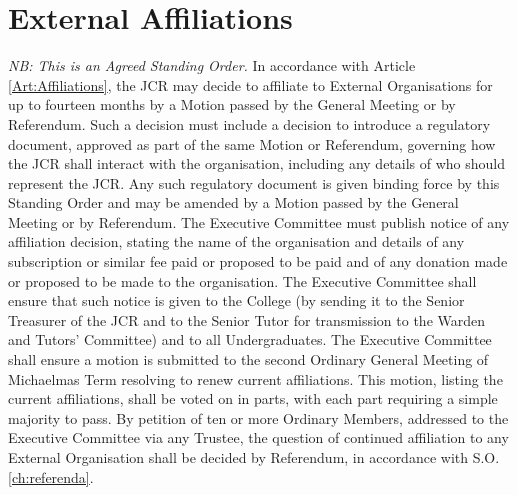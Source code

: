 \chapter{External Affiliations} \label{ch:affiliations}
\textit{NB: This is an Agreed Standing Order.}
\npara In accordance with Article \ref{Art:Affiliations}, the JCR may decide to affiliate to External Organisations for up to fourteen months by a Motion passed by the General Meeting or by Referendum.  Such a decision must include a decision to introduce a regulatory document, approved as part of the same Motion or Referendum, governing how the JCR shall interact with the organisation, including any details of who should represent the JCR.  Any such regulatory document is given binding force by this Standing Order and may be amended by a Motion passed by the General Meeting or by Referendum.
\npara The Executive Committee must publish notice of any affiliation decision, stating the name of the organisation and details of any subscription or similar fee paid or proposed to be paid and of any donation made or proposed to be made to the organisation.  The Executive Committee shall ensure that such notice is given to the College (by sending it to the Senior Treasurer of the JCR and to the Senior Tutor for transmission to the Warden and Tutors' Committee) and to all Undergraduates.
\npara The Executive Committee shall ensure a motion is submitted to the second Ordinary General Meeting of Michaelmas Term resolving to renew current affiliations. This motion, listing the current affiliations, shall be voted on in parts, with each part requiring a simple majority to pass.
\npara By petition of ten or more Ordinary Members, addressed to the Executive Committee via any Trustee, the question of continued affiliation to any External Organisation shall be decided by Referendum, in accordance with S.O.\ref{ch:referenda}.
